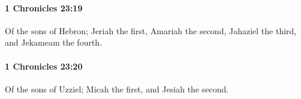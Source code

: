 		\paragraph{1 Chronicles 23:19} %
			\label{1CHRONICLES-23-19}

			Of the sons of Hebron; Jeriah the first, Amariah the second, Jahaziel the third, and Jekameam the fourth.


		\paragraph{1 Chronicles 23:20} %
			\label{1CHRONICLES-23-20}

			Of the sons of Uzziel; Micah the first, and Jesiah the second.


